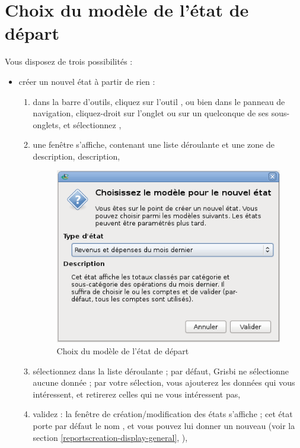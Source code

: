 \section{Choix du modèle de l'état de départ\label{reportscreation-start}}


Vous disposez de trois possibilités :

\begin{itemize}
 \item créer un nouvel état à partir de rien :
    \begin{enumerate}
		\item dans la barre d'outils, cliquez sur l'outil , ou bien dans le panneau de navigation, cliquez-droit sur l'onglet  ou sur un quelconque de ses sous-onglets, et sélectionnez , 
		\item une fenêtre s'affiche, contenant une liste déroulante et une zone de \ifIllustration description,
\else description,
\fi

\ifIllustration
\begin{figure}[htbp]
\begin{center}
\includegraphics[scale=0.5]{image/screenshot/reportcreation_new}
\end{center}
\caption{Choix du modèle de l'état de départ}
\label{reportcreation-new-img}
\end{figure}
\fi

		\item sélectionnez  dans la liste déroulante ; par défaut, Grisbi ne sélectionne aucune donnée ; par votre sélection, vous ajouterez les données qui vous intéressent, et retirerez celles qui ne vous intéressent pas,
		\item validez : la fenêtre de création/modification des états s'affiche ; cet état porte par défaut le nom , et vous pouvez lui donner un nouveau  (voir la section \vref{reportscreation-display-general}, ),
    \end{enumerate}


\end{itemize}
